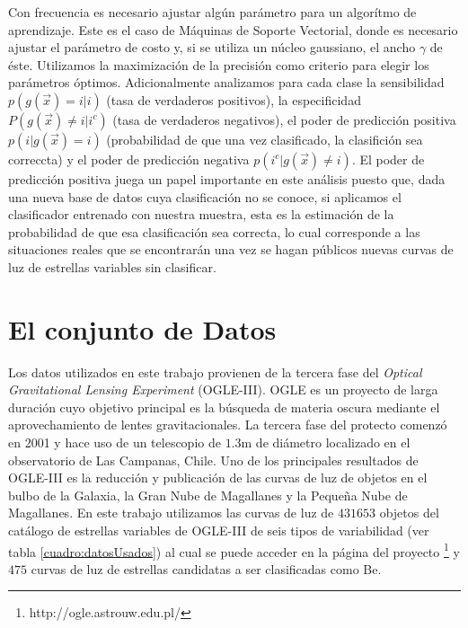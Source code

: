 \documentclass[letterpaper,12pt]{book}
\begin{document}
Con frecuencia es necesario ajustar algún parámetro para un algorítmo de aprendizaje. Este es el caso de Máquinas de Soporte Vectorial, donde es necesario ajustar el parámetro de costo y, si se utiliza un núcleo gaussiano, el ancho $\gamma$ de éste. Utilizamos la maximización de la precisión como criterio para elegir los parámetros óptimos. Adicionalmente analizamos para cada clase la sensibilidad $p(g(\vec{x})=i|i)$ (tasa de verdaderos positivos),  la especificidad $P(g(\vec{x})\neq i|i^c)$ (tasa de verdaderos negativos), el poder de predicción positiva $p(i|g(\vec{x})=i)$ (probabilidad de que una vez clasificado, la clasifición sea correccta) y el poder de predicción negativa $p(i^c|g(\vec{x})\neq i)$. El poder de predicción positiva juega un papel importante en este análisis puesto que, dada una nueva base de datos cuya clasificación no se conoce, si aplicamos el clasificador entrenado con nuestra muestra, esta es la estimación de la probabilidad de que esa clasificación sea correcta, lo cual corresponde a las situaciones reales que se encontrarán una vez se hagan públicos nuevas curvas de luz de estrellas variables sin clasificar. 





\section{El conjunto de Datos\label{cap:losDatos}}

Los datos utilizados en este trabajo provienen de la tercera fase del \textit{Optical Gravitational Lensing Experiment} (OGLE-III). OGLE es un proyecto de larga duración cuyo objetivo principal es  la búsqueda de materia oscura mediante el aprovechamiento de lentes gravitacionales. La tercera fase del protecto comenzó en 2001 y hace uso de un telescopio de $1.3$m de diámetro localizado en el observatorio de Las Campanas, Chile\cite{udalski_optical_2004}. Uno de los principales resultados de OGLE-III es la reducción y publicación \cite{udalski_optical_2008} de las curvas de luz de objetos en el bulbo de la Galaxia, la Gran Nube de Magallanes y la Pequeña Nube de Magallanes. En este trabajo utilizamos las curvas de luz de $431 653$ objetos del catálogo de estrellas variables de OGLE-III de seis tipos de variabilidad (ver tabla \ref{cuadro:datosUsados}) al cual se puede acceder en la página del proyecto \footnote{http://ogle.astrouw.edu.pl/} y $475$ curvas de luz de estrellas candidatas a ser clasificadas como Be.
\end{document}
